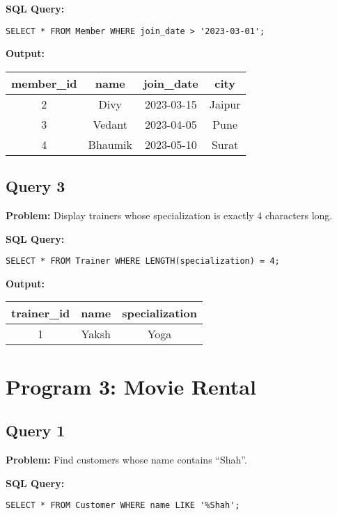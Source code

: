\documentclass[12pt]{article}
\begin{document}
\textbf{SQL Query:}  
\begin{verbatim}
SELECT * FROM Member WHERE join_date > '2023-03-01';
\end{verbatim}

\textbf{Output:}

\begin{tabular}{|c|c|c|c|}
\hline
member\_id & name & join\_date & city \\
\hline
2 & Divy & 2023-03-15 & Jaipur \\
3 & Vedant & 2023-04-05 & Pune \\
4 & Bhaumik & 2023-05-10 & Surat \\
\hline
\end{tabular}

\vspace{0.5cm}

\subsection*{Query 3}
\textbf{Problem:} Display trainers whose specialization is exactly 4 characters long.  

\textbf{SQL Query:}  
\begin{verbatim}
SELECT * FROM Trainer WHERE LENGTH(specialization) = 4;
\end{verbatim}

\textbf{Output:}

\begin{tabular}{|c|c|c|}
\hline
trainer\_id & name & specialization \\
\hline
1 & Yaksh & Yoga \\
\hline
\end{tabular}

\vspace{1cm}

\section*{Program 3: Movie Rental}

\subsection*{Query 1}
\textbf{Problem:} Find customers whose name contains ``Shah''.  

\textbf{SQL Query:}  
\begin{verbatim}
SELECT * FROM Customer WHERE name LIKE '%Shah';
\end{verbatim}
\end{document}
